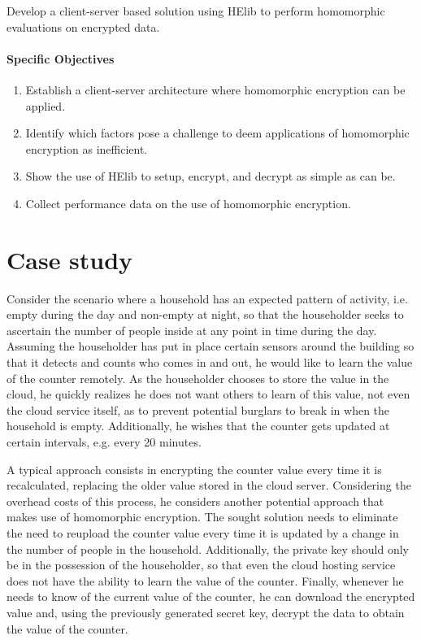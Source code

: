 Develop a client-server based solution using HElib to perform homomorphic evaluations on encrypted data.

\paragraph{Specific Objectives}
\begin{enumerate}
\item Establish a client-server architecture where homomorphic encryption can be applied.
\item Identify which factors pose a challenge to deem applications of homomorphic encryption as inefficient.
\item Show the use of HElib to setup, encrypt, and decrypt as simple as can be.
\item Collect performance data on the use of homomorphic encryption.
\end{enumerate}

\section{Case study}

Consider the scenario where a household has an expected pattern of activity, i.e. empty during the day and non-empty at night, so that the householder seeks to ascertain the number of people inside at any point in time during the day. Assuming the householder has put in place certain sensors around the building so that it detects and counts who comes in and out, he would like to learn the value of the counter remotely. As the householder chooses to store the value in the cloud, he quickly realizes he does not want others to learn of this value, not even the cloud service itself, as to prevent potential burglars to break in when the household is empty. Additionally, he wishes that the counter gets updated at certain intervals, e.g. every 20 minutes. 

A typical approach consists in encrypting the counter value every time it is recalculated, replacing the older value stored in the cloud server. Considering the overhead costs of this process, he considers another potential approach that makes use of homomorphic encryption. The sought solution needs to eliminate the need to reupload the counter value every time it is updated by a change in the number of people in the household. Additionally, the private key should only be in the possession of the householder, so that even the cloud hosting service does not have the ability to learn the value of the counter. Finally, whenever he needs to know of the current value of the counter, he can download the encrypted value and, using the previously generated secret key, decrypt the data to obtain the value of the counter.

